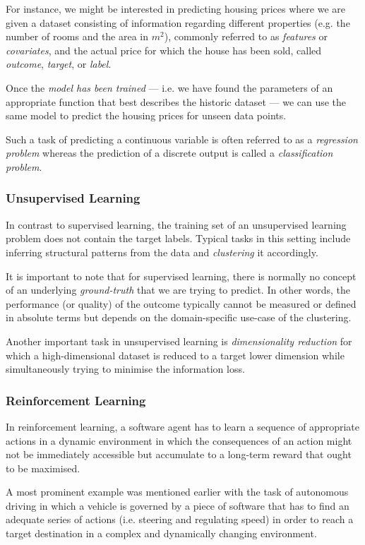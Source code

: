 For instance, we might be interested in predicting housing prices where we are given a dataset consisting of information regarding different properties (e.g. the number of rooms and the area in $m^2$), commonly referred  to as \emph{features} or \emph{covariates}, and the actual price for which the house has been sold, called \emph{outcome}, \emph{target}, or \emph{label}. 

Once the \emph{model has been trained} --- i.e. we have found the parameters of an appropriate function that best describes the historic dataset --- we can use the same model to predict the housing prices for unseen data points. 

Such a task of predicting a continuous variable is often referred to as a \emph{regression problem} whereas the prediction of a discrete output is called a \emph{classification problem}. 

\subsubsection{Unsupervised Learning} 
In contrast to supervised learning, the training set of an unsupervised learning problem does not contain the target labels. Typical tasks in this setting include inferring structural patterns from the data and \emph{clustering }it accordingly. 

It is important to note that for supervised learning, there is normally no concept of an underlying \emph{ground-truth} that we are trying to predict. In other words, the performance (or quality) of the outcome typically cannot be measured or defined in absolute terms but depends on the domain-specific use-case of the clustering. 

Another important task in unsupervised learning is \emph{dimensionality reduction} for which a high-dimensional dataset is reduced to a target lower dimension while simultaneously trying to minimise the information loss. 

\subsubsection{Reinforcement Learning}
In reinforcement learning, a software agent has to learn a sequence of appropriate actions in a dynamic environment in which the consequences of an action might not be immediately accessible but accumulate to a long-term reward that ought to be maximised. \cite{reinforcement-learning}

A most prominent example was mentioned earlier with the task of autonomous driving in which a vehicle is governed by a piece of software that has to find an adequate series of actions (i.e. steering and regulating speed) in order to reach a target destination in a complex and dynamically changing environment. 

